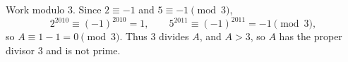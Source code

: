 Work modulo $3$. Since $2\equiv-1$ and $5\equiv-1\pmod 3$,
\[
2^{2010}\equiv(-1)^{2010}=1,\qquad 5^{2011}\equiv(-1)^{2011}=-1\pmod 3,
\]
so $A\equiv1-1=0\pmod3$. Thus $3$ divides $A$, and $A>3$, so $A$ has the proper divisor $3$ and is $\boxed{\text{not prime}}$.
